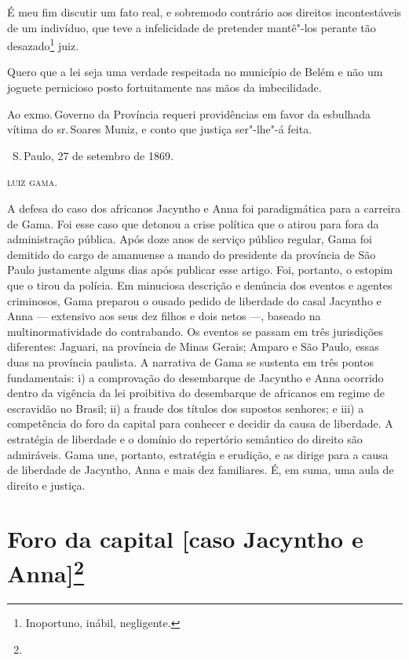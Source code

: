 É meu fim discutir um fato real, e sobremodo contrário aos direitos
incontestáveis de um indivíduo, que teve a infelicidade de pretender
mantê"-los perante tão desazado\footnote{Inoportuno, inábil,
  negligente.} juiz.

Quero que a lei seja uma verdade respeitada no município de Belém e não
um joguete pernicioso posto fortuitamente nas mãos da imbecilidade.

Ao exmo.\,Governo da Província requeri providências em favor da esbulhada
vítima do sr.\,Soares Muniz, e conto que justiça ser"-lhe"-á feita.

\vfill

\hfill\ S.\,Paulo, 27 de setembro de 1869.\smallskip

\hfill\textsc{luiz gama.}

\paginabranca
\mbox{}\vfill
\thispagestyle{empty}

{\small\noindent
A defesa do caso dos africanos Jacyntho e Anna foi paradigmática
para a carreira de Gama. Foi esse caso que detonou a crise política que
o atirou para fora da administração pública. Após doze anos de serviço
público regular, Gama foi demitido do cargo de amanuense a mando do
presidente da província de São Paulo justamente alguns dias após
publicar esse artigo. Foi, portanto, o estopim que o tirou da polícia.
Em minuciosa descrição e denúncia dos eventos e agentes criminosos, Gama
preparou o ousado pedido de liberdade do casal Jacyntho e Anna ---
extensivo aos seus dez filhos e dois netos ---, baseado na
multinormatividade do contrabando. Os eventos se passam em três
jurisdições diferentes: Jaguari, na província de Minas Gerais; Amparo e
São Paulo, essas duas na província paulista. A narrativa de Gama se
sustenta em três pontos fundamentais: i) a comprovação do desembarque de
Jacyntho e Anna ocorrido dentro da vigência da lei proibitiva do
desembarque de africanos em regime de escravidão no Brasil; ii) a fraude
dos títulos dos supostos senhores; e iii) a competência do foro da
capital para conhecer e decidir da causa de liberdade. A estratégia de
liberdade e o domínio do repertório semântico do direito são admiráveis.
Gama une, portanto, estratégia e erudição, e as dirige para a causa de
liberdade de Jacyntho, Anna e mais dez familiares. É, em suma, uma aula
de direito e justiça.}

\chapter{Foro da capital {[}caso Jacyntho e Anna{]}\footnote[*]{}}

